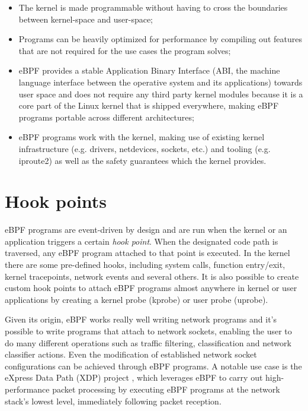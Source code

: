 \begin{itemize}
	\item The kernel is made programmable without having to cross the boundaries
		between kernel-space and user-space;
	\item Programs can be heavily optimized for performance by compiling out features
		that are not required for the use cases the program solves;
	\item eBPF provides a stable Application Binary Interface (ABI, the machine
		language interface between the operative system and its applications) towards user space and does not require any third party kernel modules because it is a core part of the Linux kernel that is shipped everywhere, making eBPF programs portable across different architectures;
	\item eBPF programs work with the kernel, making use of existing kernel
		infrastructure (e.g. drivers, netdevices, sockets, etc.) and tooling (e.g. iproute2) as well as the safety guarantees which the kernel provides.
\end{itemize}

\section{Hook points}

eBPF programs are event-driven by design and are run when the kernel or an application triggers a certain \textit{hook point}. 
When the designated code path is traversed, any eBPF program attached to that point is executed.
In the kernel there are some pre-defined hooks, including system calls, function entry/exit, kernel tracepoints, network events and several others.
It is also possible to create custom hook points to attach eBPF programs almost anywhere in kernel or user applications by creating a kernel probe (kprobe) or user probe (uprobe).

Given its origin, eBPF works really well writing network programs and it's possible to write programs that attach to network sockets, enabling the user to do many different operations such as traffic filtering, classification and network classifier actions.
Even the modification of established network socket configurations can be achieved through eBPF programs.
A notable use case is the eXpress Data Path (XDP) project \cite{XDPWebsite}, which leverages eBPF to carry out high-performance packet processing by executing eBPF programs at the network stack's lowest level, immediately following packet reception.

